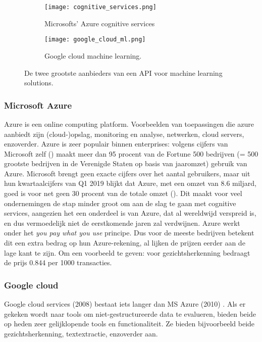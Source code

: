 \begin{figure}[h]
	\centering
	\begin{subfigure}{0.5\textwidth}
		\centering
		\texttt{[image: cognitive\_services.png]}
		\caption{Microsofts' Azure cognitive services}
		\label{fig:sub11}
	\end{subfigure}%
	\begin{subfigure}{0.5\textwidth}
		\centering
		\texttt{[image: google\_cloud\_ml.png]}
		\caption{Google cloud machine learning.}
		\label{fig:sub22}
	\end{subfigure}
	\caption{De twee grootste aanbieders van een API voor machine learning solutions.}
	\label{fig:test2}
\end{figure}

\subsubsection{Microsoft Azure}
Azure is een online computing platform. 
Voorbeelden van toepassingen die azure aanbiedt zijn (cloud-)opslag, monitoring en analyse, netwerken, cloud servers, enzoverder. 
Azure is zeer populair binnen enterprises: volgens cijfers van Microsoft zelf (\textcite{Microsoft2019}) maakt meer dan 95 procent van de Fortune 500 bedrijven (= 500 grootste bedrijven in de Verenigde Staten op basis van jaaromzet) gebruik van Azure. Microsoft brengt geen exacte cijfers over het aantal gebruikers, maar uit hun kwartaalcijfers van Q1 2019 
blijkt dat Azure, met een omzet van 8.6 miljard, goed is voor net geen 30 procent van de totale omzet (\textcite{Microsoft2019a}). 
Dit maakt voor veel ondernemingen de stap minder groot om aan de slag te gaan met cognitive services, aangezien het een onderdeel is van Azure, dat al wereldwijd verspreid is, en dus vermoedelijk niet de eerstkomende jaren zal verdwijnen. Azure werkt onder het \textit{you pay what you use} principe. Dus voor de meeste bedrijven betekent dit een extra bedrag op hun Azure-rekening, al lijken de prijzen eerder aan de lage kant te zijn. 
Om een voorbeeld te geven: voor gezichtsherkenning bedraagt de prijs \EUR{}0.844 per 1000 transacties. 
\textcite{Services2019}

\subsubsection{Google cloud}
Google cloud services (2008) bestaat iets langer dan MS Azure (2010) \textcite{RightScale2018}. 
Als er gekeken wordt naar tools om niet-gestructureerde data te evalueren, bieden beide op heden zeer gelijklopende tools en functionaliteit. Ze bieden bijvoorbeeld beide gezichtsherkenning, textextractie, enzoverder aan.  

